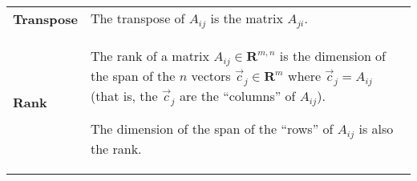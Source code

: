\documentclass[10pt, a4paper, landscape]{article}
\newcommand{\defn}[1]{\textbf{#1}}
\newcommand{\set}[1]{\mathbold{#1}}
\begin{document}
\begin{multicols*}{3}
\begin{tabularx}{\columnwidth}{@{}l>{\raggedright\arraybackslash}X@{}}

  \defn{Transpose} & The transpose of $A_{ij}$ is the matrix $A_{ji}$.
  \\

  \defn{Rank} & The rank of a matrix $A_{ij}\in\set{R}^{m,n}$ is the dimension of the span of the $n$ vectors $\vec{c}_j\in \set{R}^m$ where $\vec{c}_j = A_{ij}$ (that is, the $\vec{c}_j$ are the ``columns'' of $A_{ij}$).

  The dimension of the span of the ``rows'' of $A_{ij}$ is also the rank.
 
\end{tabularx}

\end{multicols*}
\end{document}
